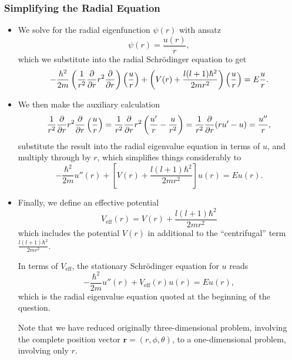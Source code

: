 \documentclass[11pt, a4paper]{article}
\newcommand{\Schro}{Schr\"{o}dinger\xspace}
\renewcommand{\vec}[1]{\bm{#1}}  %
\renewcommand{\r}{\vec{r}}  %
\newcommand{\p}{\psi}  %
\begin{document}
\subsubsection{Simplifying the Radial Equation}
\begin{itemize}
	\item We solve for the radial eigenfunction $ \p(r) $ with ansatz
	\begin{equation*}
		\p(r) = \frac{u(r)}{r},
	\end{equation*}
    which we substitute into the radial \Schro equation to get
    \begin{equation*}
        - \frac{h^{2}}{2m} \left(\frac{1}{r^{2}} \pdv{r}r^{2} \pdv{r}\right)\left( \frac{u}{r} \right) + \left(V(r) + \frac{l (l+1)\hbar^{2}}{2mr^{2}}\right)\left( \frac{u}{r} \right) = E \frac{u}{r}.
    \end{equation*}

    \item We then make the auxiliary calculation
	\begin{equation*}
		\frac{1}{r^{2}}\pdv{r}r^{2}\pdv{r} \left(\frac{u}{r}\right) = \frac{1}{r^{2}}\pdv{r}r^{2}\left(\frac{u'}{r} - \frac{u}{r^{2}}\right) = \frac{1}{r^{2}}\pdv{r}(ru' - u) = \frac{u''}{r},
	\end{equation*}
    substitute the result into the radial eigenvalue equation in terms of $ u $, and multiply through by $ r $, which simplifies things considerably to
	\begin{equation*}
		-\frac{\hbar^{2}}{2m}u''(r) + \left[V(r) + \frac{l (l+1)\hbar^{2}}{2mr^{2}}\right]u(r) = Eu(r).
	\end{equation*}
	
	\item Finally, we define an effective potential 
	\begin{equation*}
		V_{\text{eff}}(r) = V(r) + \frac{l (l+1)\hbar^{2}}{2mr^{2}}
	\end{equation*}
	which includes the potential $ V(r) $ in additional to the ``centrifugal'' term $ \frac{l (l+1)\hbar^{2}}{2mr^{2}} $.
	
	
	In terms of $ V_{\text{eff}} $, the stationary \Schro equation for $ u $ reads
	\begin{equation*}
	-\frac{\hbar^{2}}{2m}u''(r) + V_{\text{eff}}(r)u(r) = Eu(r),
	\end{equation*}
    which is the radial eigenvalue equation quoted at the beginning of the question.

	Note that we have reduced originally three-dimensional problem, involving the complete position vector $ \r = (r, \phi, \theta)  $, to a one-dimensional problem, involving only $ r $.
	
\end{itemize}
\end{document}
